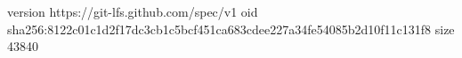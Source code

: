 version https://git-lfs.github.com/spec/v1
oid sha256:8122c01c1d2f17dc3cb1c5bcf451ca683cdee227a34fe54085b2d10f11c131f8
size 43840
